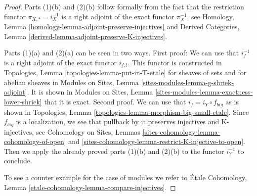 \documentclass{stacks-project}
\theoremstyle{plain}
\theoremstyle{definition}
\theoremstyle{remark}
\numberwithin{equation}{subsection}
\begin{document}
\begin{proof}
Parts (1)(b) and (2)(b)
follow formally from the fact that the restriction functor
$\pi_{X, *} = i_X^{-1}$ is a right adjoint of the exact functor
$\pi_X^{-1}$, see
Homology, Lemma \ref{homology-lemma-adjoint-preserve-injectives} and
Derived Categories, Lemma \ref{derived-lemma-adjoint-preserve-K-injectives}.

\medskip\noindent
Parts (1)(a) and (2)(a) can be seen in two ways. First proof: We can use
that $i_f^{-1}$ is a right adjoint of the exact functor $i_{f, !}$.
This functor is constructed in
Topologies, Lemma \ref{topologies-lemma-put-in-T-etale}
for sheaves of sets and for abelian sheaves in
Modules on Sites, Lemma \ref{sites-modules-lemma-g-shriek-adjoint}.
It is shown in Modules on Sites, Lemma
\ref{sites-modules-lemma-exactness-lower-shriek} that it is exact.
Second proof. We can use that $i_f = i_Y \circ f_{big}$ as is shown
in Topologies, Lemma \ref{topologies-lemma-morphism-big-small-etale}.
Since $f_{big}$ is a localization, we see that pullback by it
preserves injectives and K-injectives, see
Cohomology on Sites, Lemmas \ref{sites-cohomology-lemma-cohomology-of-open} and
\ref{sites-cohomology-lemma-restrict-K-injective-to-open}.
Then we apply the already proved parts (1)(b) and (2)(b)
to the functor $i_Y^{-1}$ to conclude.

\medskip\noindent
To see a counter example for the case of modules we refer to
\'Etale Cohomology, Lemma \ref{etale-cohomology-lemma-compare-injectives}.
\end{proof}
\end{document}
